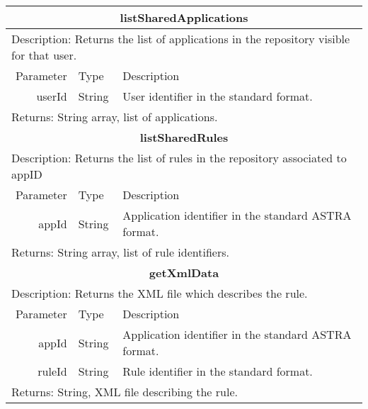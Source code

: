 \begin{table}[h!]
	\small
    \begin{center}
		\begin{tabular}{||r|l|l||}

		\hline \hline
		\multicolumn{3}{||c||}{\bfseries{listSharedApplications}} \\
		\hline
		\hline 
		\multicolumn{3}{||l||}{Description: Returns the list of applications in the
		repository visible for that user.} \\ 
		\hline \hline 
		Parameter & Type & Description \\ 
		\hline \hline
			userId & String & User identifier in the standard format. \\
		\hline \hline
		\multicolumn{3}{||l||}{Returns: String array, list of applications.} \\
		\hline \hline
        
		\hline \hline
		\multicolumn{3}{||c||}{\bfseries{listSharedRules}} \\
		\hline
		\hline 
		\multicolumn{3}{||l||}{Description: Returns the list of rules in the
		repository associated to appID} \\ 
		\hline \hline 
		Parameter & Type & Description \\ 
		\hline \hline
			appId & String & Application identifier in the standard ASTRA format. \\
		\hline \hline
		\multicolumn{3}{||l||}{Returns: String array, list of rule identifiers.} \\
		\hline \hline
		
		\hline \hline
		\multicolumn{3}{||c||}{\bfseries{getXmlData}} \\
		\hline
		\hline 
		\multicolumn{3}{||l||}{Description: Returns the XML file which describes the
		rule.} \\ \hline \hline 
		Parameter & Type & Description \\ 
		\hline \hline
			appId & String & Application identifier in the standard ASTRA format. \\
			ruleId & String & Rule identifier in the standard format. \\
		\hline \hline
		\multicolumn{3}{||l||}{Returns: String, XML file describing the rule.} \\
		\hline \hline
		

\end{tabular}
\end{center}
\end{table}
